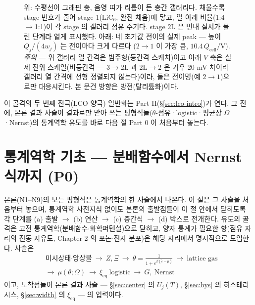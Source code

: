 \documentclass[11pt,a4paper]{article}
\newcommand{\eq}{\mathrm{eq}}
\newcommand{\cell}{\mathrm{cell}}
\begin{document}
\begin{figure}[t]
{위: 수평선이 그래핀 층, 음영 띠가 리튬이 든 층간 갤러리다. 채울수록 stage 번호가 줄어 stage 1($\mathrm{LiC_6}$,
완전 채움)에 닿고, 열 아래 비율(1:4$\to$1:1)이 각 stage 의 갤러리 점유 주기다. stage $2\mathrm L$ 은 면내 질서가
풀린 단계라 옅게 표시했다. 아래: 네 초기값 전이의 실제 peak --- 높이 $Q_j/(4w_j)$ 는 전이마다 크게 다르다
($2\to1$ 이 가장 큼, $10.4\,Q_\cell/$V). \emph{주의} --- 위 갤러리 열 간격은 범주형(등간격 스케치)이고 아래 $V$
축은 실제 전위 스케일(비등간격 --- $3\to2\mathrm L$ 과 $2\mathrm L\to2$ 은 겨우 $20$ mV 차이라 갤러리 열 간격에
선형 정렬되지 않는다)이라, 둘은 전이명(예 $2\to1$)으로만 대응시킨다. 본 문건 방향은 방전(탈리튬화)이다.}
\label{fig:staging}
\end{figure}

이 골격의 두 번째 전극(LCO 양극) 일반화는 Part II(\S\ref{sec:lco-intro})가 연다. 그 전에, 본론 결과 사슬이
결과로만 받아 쓰는 평형식들($\theta$-점유·logistic·평균장 $\Omega$·Nernst)의 통계역학 유도를 바로 다음 절
Part 0 이 처음부터 놓는다.

\section{통계역학 기초 --- 분배함수에서 Nernst 식까지 (P0)}\label{sec:sm-found}

본론(N1--N9)의 모든 평형식은 통계역학의 한 사슬에서 나온다. 이 절은 그 사슬을 처음부터 놓으며, 통계역학
사전지식 없이도 본론의 출발점들이 이 절 안에서 닫히도록 각 단계를 (a) 출발 $\to$ (b) 연산 $\to$ (c) 중간식
$\to$ (d) 박스로 전개한다. 유도의 골격은 고전 통계역학(분배함수$\cdot$화학퍼텐셜)으로 닫히고, 양자 통계가
필요한 항(점유 자리의 진동 자유도, Chapter 2 의 포논$\cdot$전자 분포)은 해당 자리에서 명시적으로 도입한다.
사슬은
\[
\boxed{\;\begin{aligned}
&\text{미시상태·앙상블}\ \to\ Z,\Xi\ \to\ \theta=\frac{1}{1+e^{\beta(\tilde\varepsilon-\mu)}}\ \to\ \text{lattice gas}\\
&\to\ \mu(\theta;\Omega)\ \to\ \xi_\eq\ \text{logistic}\ \to\ G,\ \text{Nernst}
\end{aligned}\;}
\]
이고, 도착점들이 본론 결과 사슬 --- \S\ref{sec:center} 의 $U_j(T)$, \S\ref{sec:hys} 의 히스테리시스,
\S\ref{sec:width} 의 $\xi_\eq$ --- 의 입력이다.
\end{document}
